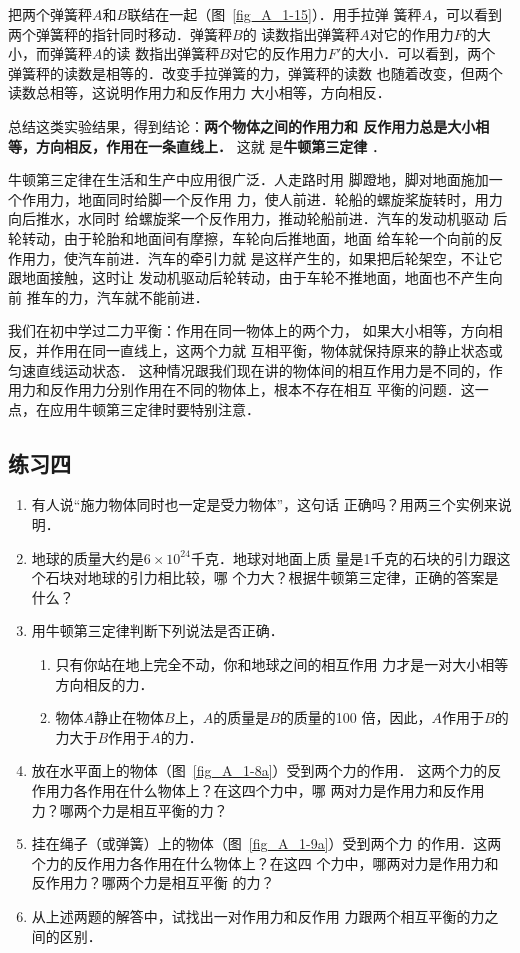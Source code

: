     把两个弹簧秤$A$和$B$联结在一起（图~\ref{fig_A_1-15}）．用手拉弹
簧秤$A$，可以看到两个弹簧秤的指针同时移动．弹簧秤$B$的
读数指出弹簧秤$A$对它的作用力$F$的大小，而弹簧秤$A$的读
数指出弹簧秤$B$对它的反作用力$F'$的大小．可以看到，两个
弹簧秤的读数是相等的．改变手拉弹簧的力，弹簧秤的读数
也随着改变，但两个读数总相等，这说明作用力和反作用力
大小相等，方向相反．

    总结这类实验结果，得到结论：\textbf{两个物体之间的作用力和
反作用力总是大小相等，方向相反，作用在一条直线上．} 这就
是\textbf{牛顿第三定律} ．

牛顿第三定律在生活和生产中应用很广泛．人走路时用
脚蹬地，脚对地面施加一个作用力，地面同时给脚一个反作用
力，使人前进．轮船的螺旋桨旋转时，用力向后推水，水同时
给螺旋桨一个反作用力，推动轮船前进．汽车的发动机驱动
后轮转动，由于轮胎和地面间有摩擦，车轮向后推地面，地面
给车轮一个向前的反作用力，使汽车前进．汽车的牵引力就
是这样产生的，如果把后轮架空，不让它跟地面接触，这时让
发动机驱动后轮转动，由于车轮不推地面，地面也不产生向前
推车的力，汽车就不能前进．

    我们在初中学过二力平衡：作用在同一物体上的两个力，
如果大小相等，方向相反，并作用在同一直线上，这两个力就
互相平衡，物体就保持原来的静止状态或匀速直线运动状态．
这种情况跟我们现在讲的物体间的相互作用力是不同的，作
用力和反作用力分别作用在不同的物体上，根本不存在相互
平衡的问题．这一点，在应用牛顿第三定律时要特别注意．


\subsection*{练习四} 
\begin{enumerate} 
\item  有人说“施力物体同时也一定是受力物体”，这句话
正确吗？用两三个实例来说明．

\item  地球的质量大约是$6\times 10^{24} $千克．地球对地面上质
量是1千克的石块的引力跟这个石块对地球的引力相比较，哪
个力大？根据牛顿第三定律，正确的答案是什么？

\item  用牛顿第三定律判断下列说法是否正确．
\begin{enumerate} 
\item  只有你站在地上完全不动，你和地球之间的相互作用
力才是一对大小相等方向相反的力．
\item  物体$A$静止在物体$B$上，$A$的质量是$B$的质量的100
倍，因此，$A$作用于$B$的力大于$B$作用于$A$的力．
\end{enumerate} 

\item  放在水平面上的物体（图~\ref{fig_A_1-8a}）受到两个力的作用．
这两个力的反作用力各作用在什么物体上？在这四个力中，哪
两对力是作用力和反作用力？哪两个力是相互平衡的力？
\item  挂在绳子（或弹簧）上的物体（图~\ref{fig_A_1-9a}）受到两个力
的作用．这两个力的反作用力各作用在什么物体上？在这四
个力中，哪两对力是作用力和反作用力？哪两个力是相互平衡
的力？
\item 从上述两题的解答中，试找出一对作用力和反作用
力跟两个相互平衡的力之间的区别．

\end{enumerate} 

